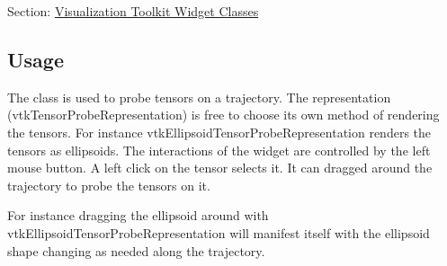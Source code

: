 Section\-: \hyperlink{sec_vtkwidgets}{Visualization Toolkit Widget Classes} \hypertarget{vtkwidgets_vtkxyplotwidget_Usage}{}\subsection{Usage}\label{vtkwidgets_vtkxyplotwidget_Usage}
The class is used to probe tensors on a trajectory. The representation (vtk\-Tensor\-Probe\-Representation) is free to choose its own method of rendering the tensors. For instance vtk\-Ellipsoid\-Tensor\-Probe\-Representation renders the tensors as ellipsoids. The interactions of the widget are controlled by the left mouse button. A left click on the tensor selects it. It can dragged around the trajectory to probe the tensors on it.

For instance dragging the ellipsoid around with vtk\-Ellipsoid\-Tensor\-Probe\-Representation will manifest itself with the ellipsoid shape changing as needed along the trajectory.

